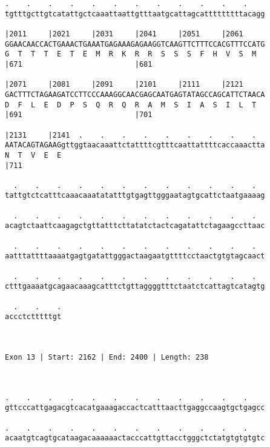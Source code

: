 \documentclass{article}
\begin{document}
\begin{Verbatim}
.    .    .    .    .    .    .    .    .    .    .    .    
tgtttgcttgtcatattgctcaaattaattgtttaatgcattagcatttttttttacagg
                                                            
|2011     |2021     |2031     |2041     |2051     |2061     
GGAACAACCACTGAAACTGAAATGAGAAAGAGAAGGTCAAGTTCTTTCCACGTTTCCATG
G  T  T  T  E  T  E  M  R  K  R  R  S  S  S  F  H  V  S  M  
|671                          |681                          
  
|2071     |2081     |2091     |2101     |2111     |2121     
GACTTTCTAGAAGATCCTTCCCAAAGGCAACGAGCAATGAGTATAGCCAGCATTCTAACA
D  F  L  E  D  P  S  Q  R  Q  R  A  M  S  I  A  S  I  L  T  
|691                          |701                          
  
|2131     |2141  .    .    .    .    .    .    .    .    .  
AATACAGTAGAAGgttggtaacaaattctattttcgtttcaattattttcaccaaactta
N  T  V  E  E                                               
|711                                                        
  
  .    .    .    .    .    .    .    .    .    .    .    .  
tattgtctcatttcaaacaaatatatttgtgagttgggaatagtgcattctaatgaaaag
                                                            
  .    .    .    .    .    .    .    .    .    .    .    .  
acagtctaattcaagagctgttatttcttatatctactcagatattctagaagccttaac
                                                            
  .    .    .    .    .    .    .    .    .    .    .    .  
aatttattttaaaatgagtgatattgggactaagaatgttttcctaactgtgtagcaact
                                                            
  .    .    .    .    .    .    .    .    .    .    .    .  
ctttgaaaatgcagaacaaagcatttctgttaggggtttctaatctcattagtcatagtg
                                                            
  .    .    .
accctctttttgt
             
             
 
Exon 13 | Start: 2162 | End: 2400 | Length: 238



.    .    .    .    .    .    .    .    .    .    .    .    
gttcccattgagacgtcacatgaaagaccactcatttaacttgaggccaagtgctgagcc
                                                            
.    .    .    .    .    .    .    .    .    .    .    .    
acaatgtcagtgcataagacaaaaaactacccattgttacctgggctctatgtgtgtgtc
                                                            

\end{Verbatim}
\end{document}
